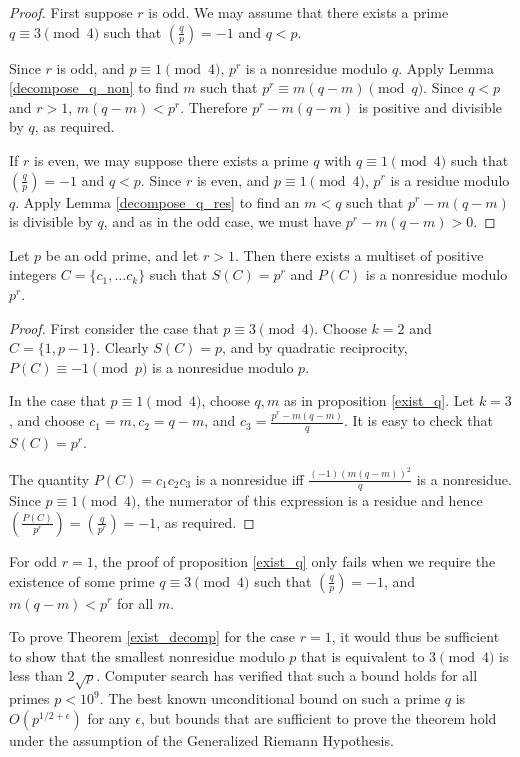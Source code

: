 \documentclass{article}
\begin{document}
\begin{proof}
  First suppose $r$ is odd. We may assume that there exists a prime
  $q \equiv 3 \pmod 4$ such that $\left( \frac{q}{p} \right) = -1$
  and $q < p$. 

  Since $r$ is odd, and $p \equiv 1 \pmod 4$, $p^r$ is a nonresidue
  modulo $q$. Apply Lemma \ref{decompose_q_non} to find $m$ such
  that $p^r \equiv m(q-m) \pmod q$. Since $q < p$ and $r > 1$,
  $m(q-m) < p^r$. Therefore $p^r - m(q-m)$ is positive and divisible
  by $q$, as required.

  If $r$ is even, we may suppose there exists a prime $q$ with $q
  \equiv 1 \pmod 4$ such that $\left( \frac{q}{p} \right) = -1$ and
  $q < p$. Since $r$ is even, and $p \equiv 1 \pmod 4$, $p^r$ is a
  residue modulo $q$. Apply Lemma \ref{decompose_q_res} to find an
  $m < q$ such that $p^r - m(q-m)$ is divisible by $q$, and as in
  the odd case, we must have $p^r - m(q-m) > 0$. 
\end{proof}
\begin{thm}
  \label{exist_decomp}
  Let $p$ be an odd prime, and let $r > 1$. Then there exists a
  multiset of positive integers $C = \{c_1, \ldots c_k\}$ such that
  $S(C) = p^r$ and $P(C)$ is a nonresidue modulo $p^r$.
\end{thm}
\begin{proof}
  First consider the case that $p \equiv 3 \pmod 4$. Choose $k = 2$
  and $C = \{1, p-1\}$. Clearly $S(C) = p$, and by quadratic
  reciprocity, $P(C) \equiv -1 \pmod p$ is a nonresidue modulo $p$.

  In the case that $p \equiv 1 \pmod 4$, choose $q,m$ as in
  proposition \ref{exist_q}. Let $k=3$, and choose $c_1 = m, c_2 =
  q-m$, and $c_3 = \frac{p^r - m(q-m)}{q}$. It is easy to check that
  $S(C) = p^r$.

  The quantity $P(C) = c_1c_2c_3$ is a nonresidue iff
  $\frac{(-1)(m(q-m))^2}{q}$ is a nonresidue. Since $p \equiv 1 \pmod
  4$, the numerator of this expression is a residue and hence $\left(
    \frac{P(C)}{p^r} \right) = \left( \frac{q}{p^r} \right) = -1$, as
  required.
\end{proof}

\begin{remark} For odd $r=1$, the proof of proposition \ref{exist_q}
  only fails when we require the existence of some prime $q \equiv 3
  \pmod 4$ such that $\left( \frac{q}{p} \right) = -1$, and $m(q-m) <
  p^r$ for all $m$.

  To prove Theorem \ref{exist_decomp} for the case $r=1$, it would
  thus be sufficient to show that the smallest nonresidue modulo $p$
  that is equivalent to $3 \pmod 4$ is less than $2\sqrt{p}$. Computer
  search has verified that such a bound holds for all primes $p <
  10^9$. The best known unconditional bound on such a prime $q$ is
  $O(p^{1/2 + \epsilon})$ for any $\epsilon$, but bounds that are
  sufficient to prove the theorem hold under the assumption of the
  Generalized Riemann Hypothesis.
\end{remark}
\end{document}
